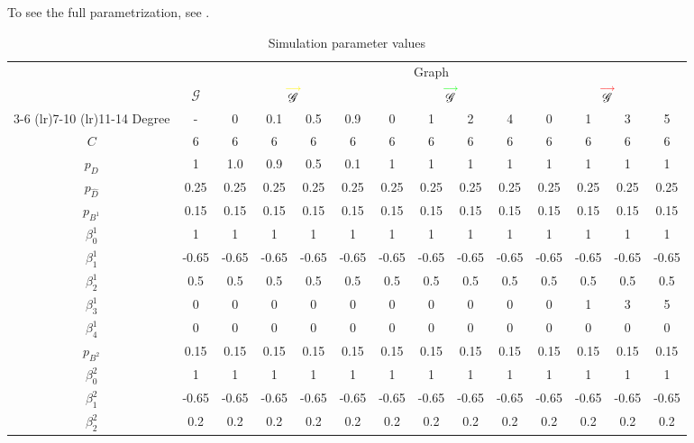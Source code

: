 \documentclass[12pt,a4paper]{article}
\renewcommand{\arraystretch}{0.5}  %
\theoremstyle{definition}
\DeclareMathOperator{\gG}{\mathscr{G}}
\begin{document}
To see the full parametrization, see .
\renewcommand{\arraystretch}{1.1}
\begin{table}
  \centering
  \caption{Simulation parameter values}
  \label{table:sim_param_values}
  \begin{threeparttable}
    \footnotesize
    \begin{tabular}{c c c c c c c c c c c c c c} \toprule
      & \multicolumn{13}{c}{Graph} \\
      & $\gG$ & \multicolumn{4}{c}{$\overset{\textcolor{yellow}{\longrightarrow}}{\gG}$} & \multicolumn{4}{c}{$\overset{\textcolor{green}{\longrightarrow}}{\gG}$} & \multicolumn{4}{c}{$\overset{\textcolor{red}{\longrightarrow}}{\gG}$} \\
      \cmidrule(lr){3-6} \cmidrule(lr){7-10} \cmidrule(lr){11-14}
      Degree & - & 0 & 0.1 & 0.5 & 0.9 & 0 & 1 & 2 & 4 & 0 & 1 & 3 & 5\\ \midrule
      $C$ & 6 & 6 & 6 & 6 & 6 & 6 & 6 & 6 & 6 & 6 & 6 & 6 & 6 \\
      $p_D$ & 1 & 1.0 & 0.9 & 0.5 & 0.1 & 1 & 1 & 1 & 1 & 1 & 1 & 1 & 1 \\
      $p_{\hat{D}}$ & 0.25 & 0.25 & 0.25 & 0.25 & 0.25 & 0.25 & 0.25 & 0.25 & 0.25 & 0.25 & 0.25 & 0.25 & 0.25 \\
      $p_{B^{1}}$ & 0.15 & 0.15 & 0.15 & 0.15 & 0.15 & 0.15 & 0.15 & 0.15 & 0.15 & 0.15 & 0.15 & 0.15 & 0.15 \\
      $\beta^1_0$ & 1 & 1 & 1 & 1 & 1 & 1 & 1 & 1 & 1 & 1 & 1 & 1 & 1 \\
      $\beta^1_1$ & -0.65 & -0.65 & -0.65 & -0.65 & -0.65 & -0.65 & -0.65 & -0.65 & -0.65 & -0.65 & -0.65 & -0.65 & -0.65 \\
      $\beta^1_2$ & 0.5 & 0.5 & 0.5 & 0.5 & 0.5 & 0.5 & 0.5 & 0.5 & 0.5 & 0.5 & 0.5 & 0.5 & 0.5 \\
      $\beta^1_3$ & 0 & 0 & 0 & 0 & 0 & 0 & 0 & 0 & 0 & 0 & 1 & 3 & 5 \\
      $\beta^1_4$ & 0 & 0 & 0 & 0 & 0 & 0 & 0 & 0 & 0 & 0 & 0 & 0 & 0 \\
      $p_{B^{2}}$ & 0.15 & 0.15 & 0.15 & 0.15 & 0.15 & 0.15 & 0.15 & 0.15 & 0.15 & 0.15 & 0.15 & 0.15 & 0.15 \\
      $\beta^2_0$ & 1 & 1 & 1 & 1 & 1 & 1 & 1 & 1 & 1 & 1 & 1 & 1 & 1 \\
      $\beta^2_1$ & -0.65 & -0.65 & -0.65 & -0.65 & -0.65 & -0.65 & -0.65 & -0.65 & -0.65 & -0.65 & -0.65 & -0.65 & -0.65 \\
      $\beta^2_2$ & 0.2 & 0.2 & 0.2 & 0.2 & 0.2 & 0.2 & 0.2 & 0.2 & 0.2 & 0.2 & 0.2 & 0.2 & 0.2 \\

\end{tabular}
\end{threeparttable}
\end{table}
\end{document}
